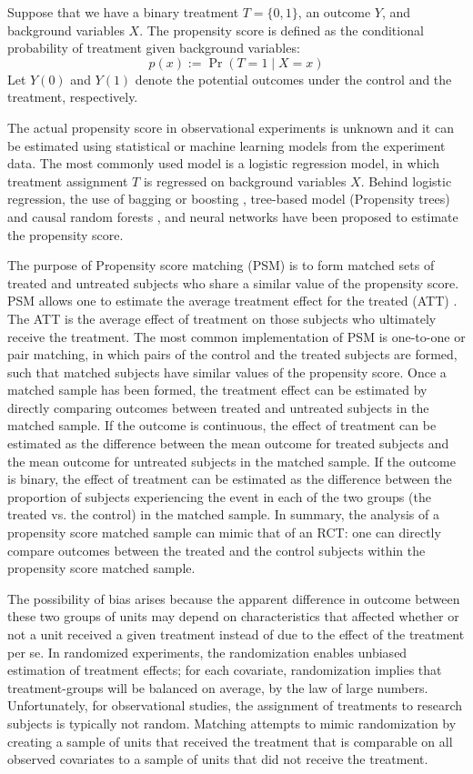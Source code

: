 \documentclass{article}
\begin{document}
Suppose that we have a binary treatment $T=\{0,1\}$, an outcome $Y$, and
background variables $X$. The propensity score is defined as the
conditional probability of treatment given background variables:
$$p(x):= \Pr(T=1 \mid X=x)$$
Let $Y(0)$ and $Y(1)$ denote the potential outcomes under the control
and the treatment, respectively.

The actual propensity score in observational experiments is
unknown and it can be estimated using statistical or machine
learning models from the experiment data. The most commonly used model
is a logistic regression model, in which treatment assignment $T$ is
regressed on background variables $X$. Behind logistic regression, the
use of bagging or boosting \cite{Lee2010-zr}, tree-based model
(Propensity trees) and causal random forests
\cite{wager2015estimation}, and neural networks
\cite{setoguchi2008evaluating} have been proposed to estimate the
propensity score.

The purpose of Propensity score matching (PSM) is to form matched sets of treated and
untreated subjects who share a similar value of the propensity
score. PSM allows one to estimate the average treatment effect for the
treated (ATT) \cite{imbens2004nonparametric}. The ATT is the average effect of treatment on those
subjects who ultimately receive the treatment. The most common
implementation of PSM is one-to-one or pair matching, in which pairs
of the control and the treated subjects are formed, such that matched
subjects have similar values of the propensity score. Once a matched
sample has been formed, the treatment effect can be estimated by
directly comparing outcomes between treated and untreated subjects in
the matched sample. If the outcome is continuous, the effect of
treatment can be estimated as the difference between the mean outcome
for treated subjects and the mean outcome for untreated subjects in
the matched sample. If the outcome is binary, the effect of treatment
can be estimated as the difference between the proportion of subjects
experiencing the event in each of the two groups (the treated
vs. the control) in the matched sample. In summary, the analysis of a propensity score matched sample can mimic that of an
RCT: one can directly compare outcomes between the treated and the control
subjects within the propensity score matched sample. 


The possibility of bias arises because the apparent difference in outcome between these two groups of units may depend on characteristics that affected whether or not a unit received a given treatment instead of due to the effect of the treatment per se. In randomized experiments, the randomization enables unbiased estimation of treatment effects; for each covariate, randomization implies that treatment-groups will be balanced on average, by the law of large numbers. Unfortunately, for observational studies, the assignment of treatments to research subjects is typically not random. Matching attempts to mimic randomization by creating a sample of units that received the treatment that is comparable on all observed covariates to a sample of units that did not receive the treatment.
\end{document}
